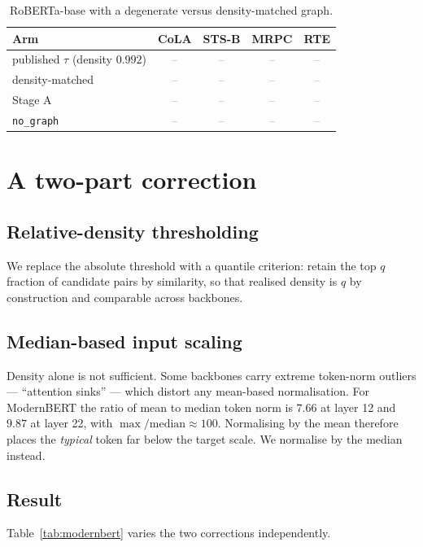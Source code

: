 \documentclass{article} %
\newcommand{\PEND}{\textcolor{gray}{--}}
\begin{document}
\begin{table}[t]
\caption{RoBERTa-base with a degenerate versus density-matched graph.}
\label{tab:roberta}
\begin{center}
\begin{tabular}{lcccc}
\toprule
Arm & CoLA & STS-B & MRPC & RTE \\
\midrule
published $\tau$ (density $0.992$) & \PEND & \PEND & \PEND & \PEND \\
density-matched                    & \PEND & \PEND & \PEND & \PEND \\
Stage A                            & \PEND & \PEND & \PEND & \PEND \\
\texttt{no\_graph}                 & \PEND & \PEND & \PEND & \PEND \\
\bottomrule
\end{tabular}
\end{center}
\end{table}

\section{A two-part correction}
\label{sec:fix}

\subsection{Relative-density thresholding}
We replace the absolute threshold with a quantile criterion: retain the top
$q$ fraction of candidate pairs by similarity, so that realised density is
$q$ by construction and comparable across backbones.

\subsection{Median-based input scaling}
\label{sec:scaling}
Density alone is not sufficient. Some backbones carry extreme token-norm
outliers --- ``attention sinks'' --- which distort any mean-based
normalisation. For ModernBERT the ratio of mean to median token norm is
$7.66$ at layer 12 and $9.87$ at layer 22, with $\max/\text{median} \approx
100$. Normalising by the mean therefore places the \emph{typical} token far
below the target scale. We normalise by the median instead.

\subsection{Result}
Table~\ref{tab:modernbert} varies the two corrections independently.
\end{document}
